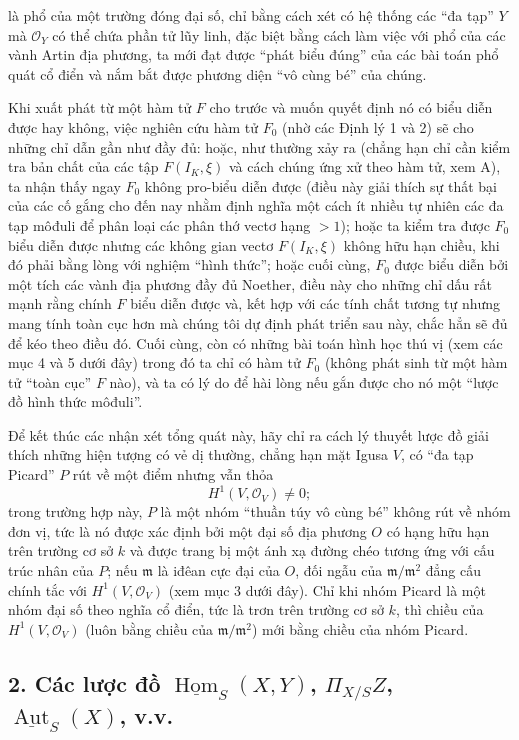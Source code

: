 \documentclass[11pt,twoside,openany]{book}
\numberwithin{equation}{section}
\newcommand{\src}[1]{%
  \phantomsection\hypertarget{src:\fgasourceid:#1}{}%
  \marginpar{\raggedleft\footnotesize\sffamily #1}%
}
\newcommand{\fgasourceid}{unset}
\begin{document}
\src{380}
là phổ của một trường đóng đại số, chỉ bằng cách xét có hệ thống các ``đa
tạp'' $Y$ mà $\mathcal O_Y$ có thể chứa phần tử lũy linh, đặc biệt bằng cách
làm việc với phổ của các vành Artin địa phương, ta mới đạt được ``phát biểu
đúng'' của các bài toán phổ quát cổ điển và nắm bắt được phương diện ``vô cùng
bé'' của chúng.

Khi xuất phát từ một hàm tử $F$ cho trước và muốn quyết định nó có biểu diễn
được hay không, việc nghiên cứu hàm tử $F_0$ (nhờ các Định lý 1 và 2) sẽ cho
những chỉ dẫn gần như đầy đủ: hoặc, như thường xảy ra (chẳng hạn chỉ cần kiểm
tra bản chất của các tập $F(I_K,\xi)$ và cách chúng ứng xử theo hàm tử, xem A),
ta nhận thấy ngay $F_0$ không pro-biểu diễn được (điều này giải thích sự thất
bại của các cố gắng cho đến nay nhằm định nghĩa một cách ít nhiều tự nhiên
các đa tạp môđuli để phân loại các phân thớ vectơ hạng $>1$); hoặc ta kiểm tra
được $F_0$ biểu diễn được nhưng các không gian vectơ $F(I_K,\xi)$ không hữu
hạn chiều, khi đó phải bằng lòng với nghiệm ``hình thức''; hoặc cuối cùng,
$F_0$ được biểu diễn bởi một tích các vành địa phương đầy đủ Noether, điều này
cho những chỉ dấu rất mạnh rằng chính $F$ biểu diễn được và, kết hợp với các
tính chất tương tự nhưng mang tính toàn cục hơn mà chúng tôi dự định phát
triển sau này, chắc hẳn sẽ đủ để kéo theo điều đó. Cuối cùng, còn có những bài
toán hình học thú vị (xem các mục 4 và 5 dưới đây) trong đó ta chỉ có hàm tử
$F_0$ (không phát sinh từ một hàm tử ``toàn cục'' $F$ nào), và ta có lý do để
hài lòng nếu gắn được cho nó một ``lược đồ hình thức môđuli''.

Để kết thúc các nhận xét tổng quát này, hãy chỉ ra cách lý thuyết lược đồ giải
thích những hiện tượng có vẻ dị thường, chẳng hạn mặt Igusa $V$, có ``đa tạp
Picard'' $P$ rút về một điểm nhưng vẫn thỏa
\[
  H^1(V,\mathcal O_V)\ne 0 ;
\]
trong trường hợp này, $P$ là một nhóm ``thuần túy vô cùng bé'' không rút về
nhóm đơn vị, tức là nó được xác định bởi một đại số địa phương $O$ có hạng hữu
hạn trên trường cơ sở $k$ và được trang bị một ánh xạ đường chéo tương ứng với
cấu trúc nhân của $P$; nếu $\mathfrak m$ là iđêan cực đại của $O$, đối ngẫu của
$\mathfrak m/\mathfrak m^2$ đẳng cấu chính tắc với
$H^1(V,\mathcal O_V)$ (xem mục 3 dưới đây). Chỉ khi nhóm Picard là một nhóm
đại số theo nghĩa cổ điển, tức là trơn trên trường cơ sở $k$, thì chiều của
$H^1(V,\mathcal O_V)$ (luôn bằng chiều của $\mathfrak m/\mathfrak m^2$) mới
bằng chiều của nhóm Picard.

\subsection*{2. Các lược đồ $\underline{\operatorname{Hom}}_S(X,Y)$,
$\Pi_{X/S}Z$, $\underline{\operatorname{Aut}}_S(X)$, v.v.}
\end{document}

